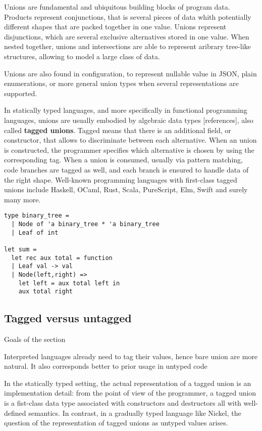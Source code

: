 \documentclass{article}
\begin{document}
Unions are fundamental and ubiquitous building blocks of program data. Products
represent conjunctions, that is several pieces of data whith potentially
different shapes that are packed together in one value. Unions represent
disjunctions, which are several exclusive alternatives stored in one value. When
nested together, unions and intersections are able to represent aribrary
tree-like structures, allowing to model a large class of data.

Unions are also found in configuration, to represent nullable value in JSON,
plain enumerations, or more general union types when several representations are
supported.

In statically typed languages, and more specifically in functional programming
languages, unions are usually embodied by algebraic data types [references],
also called \textbf{tagged unions}. Tagged means that there is an additional
field, or constructor, that allows to discriminate between each alternative.
When an union is constructed, the programmer specifies which alternative is
chosen by using the corresponding tag. When a union is consumed, usually via
pattern matching, code branches are tagged as well, and each branch is ensured
to handle data of the right shape. Well-known programming languages with
first-class tagged unions include Haskell, OCaml, Rust, Scala, PureScript, Elm,
Swift and surely many more.

\begin{lstlisting}[caption={Example of a binary tree as a tagged union in OCaml}, captionpos=b]
type binary_tree =
  | Node of 'a binary_tree * 'a binary_tree
  | Leaf of int

let sum =
  let rec aux total = function
  | Leaf val -> val
  | Node(left,right) =>
    let left = aux total left in
    aux total right
\end{lstlisting}

\subsection{Tagged versus untagged}
\color{red}Goals of the section

Interpreted languages already need to tag their values, hence bare union are more natural.
It also corresponds better to prior usage in untyped code\vspace{0.5cm}\color{black}

In the statically typed setting, the actual representation of a tagged union is
an implementation detail: from the point of view of the programmer, a tagged
union is a fist-class data type associated with constructors and destructors all
with well-defined semantics. In contrast, in a gradually typed language like
Nickel, the question of the representation of tagged unions as untyped values
arises.
\end{document}
